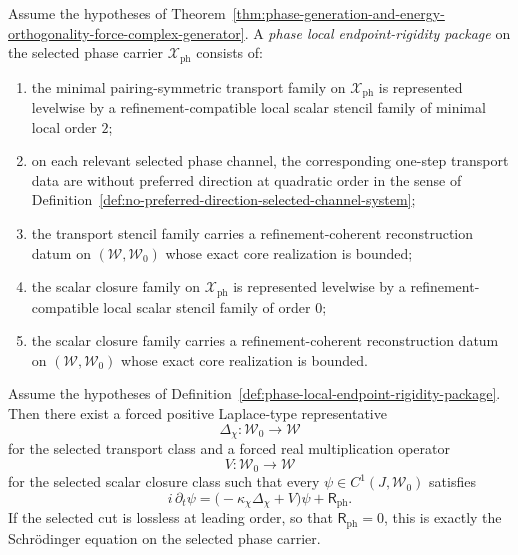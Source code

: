\begin{definition}
\label{def:phase-local-endpoint-rigidity-package}
Assume the hypotheses of
Theorem~\ref{thm:phase-generation-and-energy-orthogonality-force-complex-generator}.
A \emph{phase local endpoint-rigidity package} on the selected phase carrier
\(\mathcal X_{\mathrm{ph}}\) consists of:
\begin{enumerate}[label=(\roman*),itemsep=0.2em]
\item the minimal pairing-symmetric transport family on
      \(\mathcal X_{\mathrm{ph}}\) is represented levelwise by a
      refinement-compatible local scalar stencil family of minimal local order
      \(2\);
\item on each relevant selected phase channel, the corresponding one-step
      transport data are without preferred direction at quadratic order in the
      sense of
      Definition~\ref{def:no-preferred-direction-selected-channel-system};
\item the transport stencil family carries a refinement-coherent
      reconstruction datum on \((\mathcal W,\mathcal W_0)\) whose exact core
      realization is bounded;
\item the scalar closure family on \(\mathcal X_{\mathrm{ph}}\) is represented
      levelwise by a refinement-compatible local scalar stencil family of
      order \(0\);
\item the scalar closure family carries a refinement-coherent reconstruction
      datum on \((\mathcal W,\mathcal W_0)\) whose exact core realization is
      bounded.
\end{enumerate}
\end{definition}

\begin{theorem}
\label{thm:phase-local-endpoint-collapse}
Assume the hypotheses of
Definition~\ref{def:phase-local-endpoint-rigidity-package}. Then there exist a
forced positive Laplace-type representative
\[
\Delta_{\chi}:\mathcal W_0\to\mathcal W
\]
for the selected transport class and a forced real multiplication operator
\[
V:\mathcal W_0\to\mathcal W
\]
for the selected scalar closure class such that every
\(\psi\in C^1(J,\mathcal W_0)\) satisfies
\[
i\,\partial_t\psi
=
\bigl(-\kappa_{\chi}\Delta_{\chi}+V\bigr)\psi
+
\mathsf R_{\mathrm{ph}}.
\]
If the selected cut is lossless at leading order, so that
\(\mathsf R_{\mathrm{ph}}=0\), this is exactly the Schr\"odinger equation on
the selected phase carrier.
\end{theorem}

